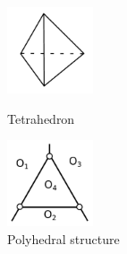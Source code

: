 \documentclass[suppldata, dvipdfmx]{interact}
\theoremstyle{plain}%
\theoremstyle{definition}
\theoremstyle{remark}
\theoremstyle{problemstyle}
\begin{document}
\begin{figure}[h!tbp]
  \begin{minipage}[t]{0.5\textwidth}
   \centering
   \includegraphics[width=1in, keepaspectratio]{./img/HexahedraWithSphericalFaces/tetrahedron/tetrahedron.jpg}
   \caption{Tetrahedron}
   \label{fig:tetrahedron}
  \end{minipage}
 \hspace*{\fill}
  \begin{minipage}[t]{0.5\textwidth}
   \centering
   \includegraphics[width=1in, keepaspectratio]{./img/HexahedraWithSphericalFaces/tetrahedron/faces.jpg}
   \caption{Polyhedral structure}
   \label{fig:tetrahedronFaces}
  \end{minipage}
 \hspace*{\fill}
\end{figure}
\end{document}

